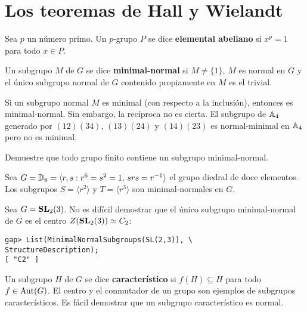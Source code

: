 \chapter{Los teoremas de Hall y Wielandt}
\label{HallWielandt}

\begin{definition}
	Sea $p$ un número primo. Un $p$-grupo $P$ se dice \textbf{elemental
	abeliano} si $x^p=1$ para todo $x\in P$.
\end{definition}

\begin{definition}
	Un subgrupo $M$ de $G$ se dice \textbf{minimal-normal} si $M\ne\{1\}$,
	$M$ es normal en $G$ y el único subgrupo normal de $G$ contenido
	propiamente en $M$ es el trivial. 
\end{definition}

\begin{example}
	Si un subgrupo normal $M$ es minimal (con respecto a la inclusión),
	entonces es minimal-normal. Sin embargo, la recíproca no es cierta.  El
	subgrupo de $\mathbb{A}_4$ generado por $(12)(34)$, $(13)(24)$ y $(14)(23)$ es
	normal-minimal en $\mathbb{A}_4$ pero no es minimal. 
\end{example}

\begin{exercise}
	Demuestre que todo grupo finito contiene un subgrupo minimal-normal. 
\end{exercise}

\begin{example}
	Sea $G=\mathbb{D}_{6}=\langle r,s:r^6=s^2=1,\,srs=r^{-1}\rangle$ el grupo diedral
	de doce elementos. Los subgrupos $S=\langle r^2\rangle$ 
	y $T=\langle r^3\rangle$ son minimal-normales en $G$.
\end{example}

\begin{example}
	Sea $G=\mathbf{SL}_2(3)$. No es difícil demostrar que el único subgrupo
	minimal-normal de $G$ es el centro $Z(\mathbf{SL}_2(3))\simeq C_2$:
\begin{lstlisting}
gap> List(MinimalNormalSubgroups(SL(2,3)), \
StructureDescription);
[ "C2" ]
\end{lstlisting}
\end{example}

Un subgrupo $H$ de $G$ se dice \textbf{característico} si 
$f(H)\subseteq H$ para todo $f\in\operatorname{Aut}(G)$. 
El centro y el conmutador de un grupo son ejemplos de subgrupos característicos. 
Es fácil demostrar que
un subgrupo característico es normal.  

